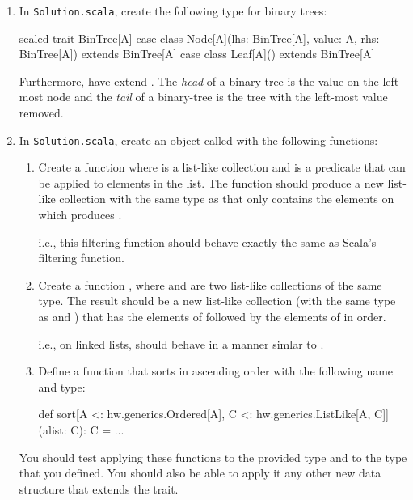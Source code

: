 \documentclass[9pt]{extbook}
\begin{document}
\begin{enumerate}

  \item In \texttt{Solution.scala}, create the following type for
  binary trees:
  \begin{scalacode}
  sealed trait BinTree[A]
  case class Node[A](lhs: BinTree[A], value: A, rhs: BinTree[A]) extends BinTree[A]
  case class Leaf[A]() extends BinTree[A]
  \end{scalacode}

  Furthermore, have  extend .
  The \emph{head} of a binary-tree is the value on the left-most node
  and the \emph{tail} of a binary-tree is the tree with the left-most
  value removed.

  \item In \texttt{Solution.scala}, create an object called  with the following functions:

    \begin{enumerate}

      \item Create a function 
      where  is a list-like collection and
       is a predicate that can be applied to elements in
      the list. The function should produce a new list-like collection
      with the same type as  that only contains the
      elements on which  produces .

      i.e., this filtering function should behave exactly the same
      as Scala's filtering function.

      \item Create a function , where
       and  are two list-like
      collections of the same type. The result should be a new list-like
      collection (with the same type as  and
      ) that has the elements of 
      followed by the elements of  in order.

      i.e., on linked lists,  should
      behave in a manner simlar to . 
      \item Define a function that sorts in ascending order with the
      following name and type:

      \begin{scalacode}
      def sort[A <: hw.generics.Ordered[A], C <: hw.generics.ListLike[A, C]](alist: C): C = {
        ...
      }
      \end{scalacode}

    \end{enumerate}

    You should test applying these functions to the provided
     type and to the  type that
    you defined. You should also be able to apply it any other new data
    structure that extends the  trait. 
\end{enumerate}
\end{document}
